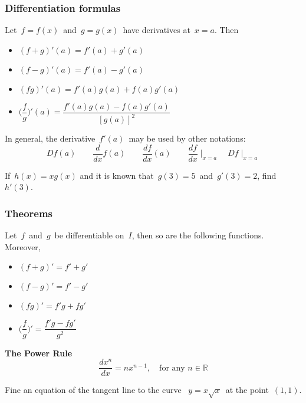 \newcommand \derv [1] {\frac{d {#1} }{d x}}
\newcommand \dderv [1] {\frac{d^2 {#1} }{d x^2}}




 \begin{frame}[fragile] \frametitle{Differentiation formulas}
Let\ $f=f(x)$\ and\ $g=g(x)$\ have derivatives at\ $x=a$. Then
\begin{itemize}
	\item $(f+g)'(a) = f'(a) + g'(a)$\\
	\item $(f-g)'(a) = f'(a) - g'(a)$\\
	\item $(fg)'(a) = f'(a)g(a) + f(a)g'(a)$\\
	\item$\big( \dfrac{f}{g} \big)'(a) = \dfrac{f'(a)g(a) - f(a)g'(a)}{[g(a)]^2}$
\end{itemize}

In general, the derivative\ $f'(a)$\  may be used by other notations:
\[ D f(a) \qquad \derv{} f(a) \qquad \derv f(a) \qquad \derv f \mid_{x=a} \quad D f \mid_{x=a} \]

If\ $h(x)=x g(x)$ and it is known that\ $g(3)=5$\ and\ $g'(3)=2$, find\ $h'(3)$.

\end{frame}

 \begin{frame}[fragile] \frametitle{Theorems}
Let\ $f$\ and\ $g$\ be differentiable on\ $I$, then so are the following functions. Moreover,
\begin{itemize}
	\item $(f+g)' = f' + g'$\\
	\item $(f-g)' = f' - g'$\\
	\item $(fg)' = f'g + fg'$\\
	\item $\big( \dfrac{f}{g} \big)' = \dfrac{f'g - fg'}{g^2}$
\end{itemize}

\textbf{The Power Rule}
\[ \derv {x^n} = n x^{n-1}, \quad \text{for any\ } n\in \mathbb R \]



 Fine an equation of the tangent line to the curve \ $y=x \sqrt x$\ at the point\ $(1,1)$. 


\end{frame}


